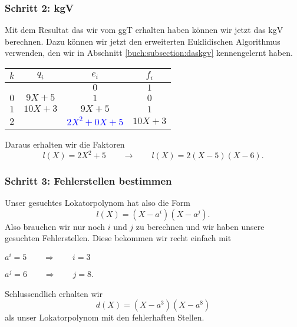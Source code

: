 \subsubsection{Schritt 2: kgV}

Mit dem Resultat das wir vom ggT erhalten haben können wir jetzt das kgV berechnen. Dazu können wir jetzt den erweiterten Euklidischen Algorithmus verwenden, den wir in Abschnitt \ref{buch:subsection:daskgv} kennengelernt haben.
%
%
\begin{center}
	
	\begin{tabular}{| c | c | c c |}
		\hline
		$k$ &  $q_i$ & $e_i$ & $f_i$\\
		\hline 
		& & $0$& $1$\\
		$0$& $9X + 5$& $1$& $0$\\
		$1$& $10X + 3$& $9X+5$& $1$\\
		$2$& & \textcolor{blue}{$2X^2 + 0X + 5$}& $10X + 3$\\
		\hline
	\end{tabular}	
	
\end{center}
Daraus erhalten wir die Faktoren
\[
l(X) = 2X^2 + 5 \qquad \rightarrow \qquad l(X) = 2(X-5)(X-6).
\]
\subsubsection{Schritt 3: Fehlerstellen bestimmen}
Unser gesuchtes Lokatorpolynom hat also die Form
\[
l(X) = (X-a^i)(X-a^j).
\]
Also brauchen wir nur noch $i$ und $j$ zu berechnen und wir haben unsere gesuchten Fehlerstellen.
Diese bekommen wir recht einfach mit
\begin{center}
	$a^i = 5 \qquad \Rightarrow \qquad i = 3$
	
	$a^j = 6 \qquad \Rightarrow \qquad j = 8$.
\end{center}
Schlussendlich erhalten wir
\[
d(X) = (X-a^3)(X-a^8)
\]
als unser Lokatorpolynom mit den fehlerhaften Stellen.
